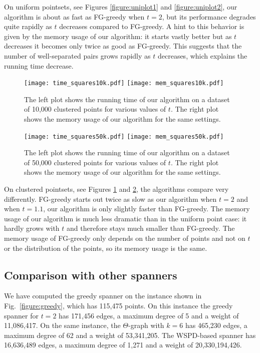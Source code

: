 \documentclass[runningheads,envcountsame,oribibl,orivec]{llncs}
\begin{document}
On uniform pointsets, see Figures \ref{figure:uniplot1} and \ref{figure:uniplot2}, our algorithm is about as fast as FG-greedy when $t=2$, but its performance degrades quite rapidly as $t$ decreases compared to FG-greedy. A hint to this behavior is given by the memory usage of our algorithm: it starts vastly better but as $t$ decreases it becomes only twice as good as FG-greedy. This suggests that the number of well-separated pairs grows rapidly as $t$ decreases, which explains the running time decrease.

\begin{figure}[h!]\centering
\texttt{[image: time\_squares10k.pdf]}
\texttt{[image: mem\_squares10k.pdf]}
\caption{The left plot shows the running time of our algorithm on a dataset of 10,000 clustered points for various values of $t$. The right plot shows the memory usage of our algorithm for the same settings.}
\label{figure:clusteredplot1}
\end{figure}

\begin{figure}[h!]\centering
\texttt{[image: time\_squares50k.pdf]}
\texttt{[image: mem\_squares50k.pdf]}
\caption{The left plot shows the running time of our algorithm on a dataset of 50,000 clustered points for various values of $t$. The right plot shows the memory usage of our algorithm for the same settings.}
\label{figure:clusteredplot2}
\end{figure}

On clustered pointsets, see Figures \ref{figure:clusteredplot1} and \ref{figure:clusteredplot2}, the algorithms compare very differently. FG-greedy starts out twice as slow as our algorithm when $t=2$ and when $t=1.1$, our algorithm is only slightly faster than FG-greedy. The memory usage of our algorithm is much less dramatic than in the uniform point case: it hardly grows with $t$ and therefore stays much smaller than FG-greedy. The memory usage of FG-greedy only depends on the number of points and not on $t$ or the distribution of the points, so its memory usage is the same.

\subsection{Comparison with other spanners}

We have computed the greedy spanner on the instance shown in Fig.~\ref{figure:greedy}, which has 115,475 points. On this instance the greedy spanner for $t=2$ has 171,456 edges, a maximum degree of 5 and a weight of 11,086,417. On the same instance, the $\Theta$-graph with $k=6$ has 465,230 edges, a maximum degree of 62 and a weight of 53,341,205. The WSPD-based spanner has 16,636,489 edges, a maximum degree of 1,271 and a weight of 20,330,194,426.
\end{document}
